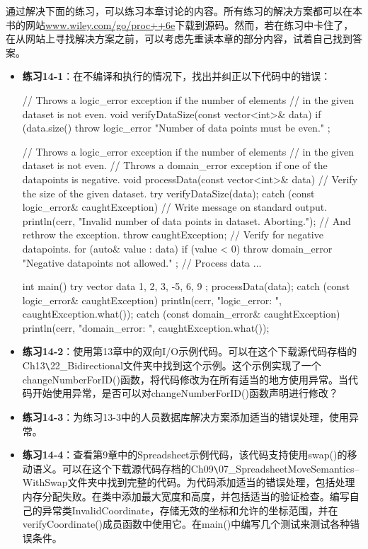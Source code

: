 通过解决下面的练习，可以练习本章讨论的内容。所有练习的解决方案都可以在本书的网站\url{www.wiley.com/go/proc++6e}下载到源码。然而，若在练习中卡住了，在从网站上寻找解决方案之前，可以考虑先重读本章的部分内容，试着自己找到答案。

\begin{itemize}
\item
\textbf{练习14-1}：在不编译和执行的情况下，找出并纠正以下代码中的错误：

\begin{cpp}
// Throws a logic_error exception if the number of elements
// in the given dataset is not even.
void verifyDataSize(const vector<int>& data)
{
    if (data.size() %
        throw logic_error { "Number of data points must be even." };
}

// Throws a logic_error exception if the number of elements
// in the given dataset is not even.
// Throws a domain_error exception if one of the datapoints is negative.
void processData(const vector<int>& data)
{
    // Verify the size of the given dataset.
    try {
        verifyDataSize(data);
    } catch (const logic_error& caughtException) {
        // Write message on standard output.
        println(cerr, "Invalid number of data points in dataset. Aborting.");
        // And rethrow the exception.
        throw caughtException;
    }
    // Verify for negative datapoints.
    for (auto& value : data) {
        if (value < 0)
            throw domain_error { "Negative datapoints not allowed." };
    }
    // Process data ...
}

int main()
{
    try {
        vector data { 1, 2, 3, -5, 6, 9 };
        processData(data);
    } catch (const logic_error& caughtException) {
        println(cerr, "logic_error: {}", caughtException.what());
    } catch (const domain_error& caughtException) {
        println(cerr, "domain_error: {}", caughtException.what());
    }
}
\end{cpp}

\item
\textbf{练习14-2}：使用第13章中的双向I/O示例代码。可以在这个下载源代码存档的Ch13\verb|\|22\_Bidirectional文件夹中找到这个示例。这个示例实现了一个changeNumberForID()函数，将代码修改为在所有适当的地方使用异常。当代码开始使用异常，是否可以对changeNumberForID()函数声明进行修改？

\item
\textbf{练习14-3}：为练习13-3中的人员数据库解决方案添加适当的错误处理，使用异常。

\item
\textbf{练习14-4}：查看第9章中的Spreadsheet示例代码，该代码支持使用swap()的移动语义。可以在这个下载源代码存档的Ch09\verb|\|07\_SpreadsheetMoveSemantics–WithSwap文件夹中找到完整的代码。为代码添加适当的错误处理，包括处理内存分配失败。在类中添加最大宽度和高度，并包括适当的验证检查。编写自己的异常类InvalidCoordinate，存储无效的坐标和允许的坐标范围，并在verifyCoordinate()成员函数中使用它。在main()中编写几个测试来测试各种错误条件。
\end{itemize}














